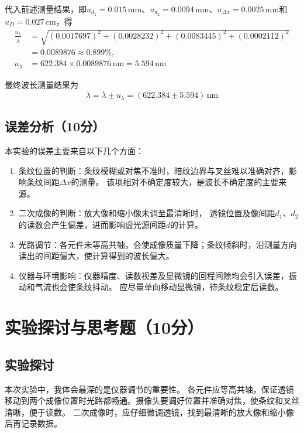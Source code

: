 \documentclass[10pt,a4paper]{ctexart} %
\begin{document}
  代入前述测量结果，即$u_{d_1}=0.015\,\mathrm{mm}$、$u_{d_2}=0.0094\,\mathrm{mm}$、$u_{\Delta x}=0.0025\,\mathrm{mm}$和$u_D=0.027\,\mathrm{cm}$，得
  \[
    \begin{aligned}
      \frac{u_\lambda}{\overline{\lambda}}
        &=\sqrt{(0.0017697)^2+(0.0028232)^2
                 +(0.0083445)^2+(0.0002112)^2}\\
        &=0.0089876\approx0.899\%,\\
      u_\lambda&=622.384\times0.0089876\,\mathrm{nm}
                 =5.594\,\mathrm{nm}
    \end{aligned}
  \]

  最终波长测量结果为
  \[
    \boxed{\lambda=\overline{\lambda}\pm u_\lambda
      =(622.384\pm5.594)\,\mathrm{nm}}
  \]

  \subsection{误差分析（10分）}
  本实验的误差主要来自以下几个方面：
  \begin{enumerate}
    \item 条纹位置的判断：条纹模糊或对焦不准时，暗纹边界与叉丝难以准确对齐，影响条纹间距$\Delta x$的测量。
    该项相对不确定度较大，是波长不确定度的主要来源。

    \item 二次成像的判断：放大像和缩小像未调至最清晰时，
    透镜位置及像间距$d_1$、$d_2$的读数会产生偏差，进而影响虚光源间距$d$的计算。

    \item 光路调节：各元件未等高共轴，会使成像质量下降；条纹倾斜时，沿测量方向读出的间距偏大，使计算得到的波长偏大。
    
    \item 仪器与环境影响：仪器精度、读数视差及显微镜的回程间隙均会引入误差，振动和气流也会使条纹抖动。
    应尽量单向移动显微镜，待条纹稳定后读数。
  \end{enumerate}

\section{实验探讨与思考题（10分）}

  \subsection{实验探讨}
  本次实验中，我体会最深的是仪器调节的重要性。
  各元件应等高共轴，保证透镜移动到两个成像位置时光路都畅通。摄像头要调好位置并准确对焦，使条纹和叉丝清晰，便于读数。
  二次成像时，应仔细微调透镜，找到最清晰的放大像和缩小像后再记录数据。
\end{document}
